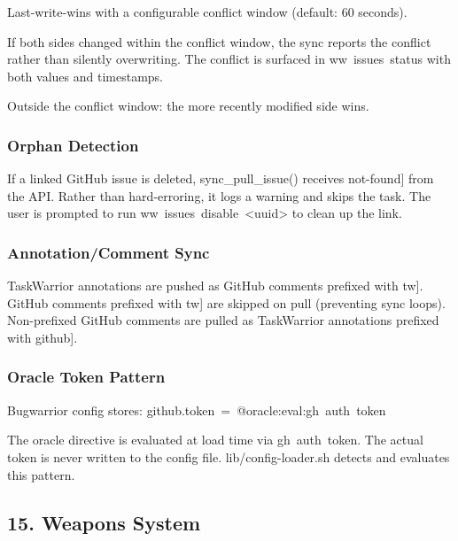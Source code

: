 \documentclass[11pt, a4paper, DIV=14]{scrartcl}
\renewcommand{\texttt}[1]{{\ttfamily\fontsize{8.5}{10.5}\selectfont\color{BabbNavy}#1}}
\let\origRule\rule
\renewcommand{\rule}[2]{\par\noindent{\color{BabbBorder}\origRule{#1}{#2}}\par}
\begin{document}
Last-write-wins with a configurable conflict window (default: 60
seconds).

If both sides changed within the conflict window, the sync reports the
conflict rather than silently overwriting. The conflict is surfaced in
\texttt{ww\ issues\ status} with both values and timestamps.

Outside the conflict window: the more recently modified side wins.

\subsubsection{Orphan Detection}\label{orphan-detection}

If a linked GitHub issue is deleted, \texttt{sync\_pull\_issue()}
receives \texttt{{[}not-found{]}} from the API. Rather than
hard-erroring, it logs a warning and skips the task. The user is
prompted to run
\texttt{ww\ issues\ disable\ \textless{}uuid\textgreater{}} to clean up
the link.

\subsubsection{Annotation/Comment Sync}\label{annotationcomment-sync}

TaskWarrior annotations are pushed as GitHub comments prefixed with
\texttt{{[}tw{]}}. GitHub comments prefixed with \texttt{{[}tw{]}} are
skipped on pull (preventing sync loops). Non-prefixed GitHub comments
are pulled as TaskWarrior annotations prefixed with
\texttt{{[}github{]}}.

\subsubsection{Oracle Token Pattern}\label{oracle-token-pattern}

Bugwarrior config stores:
\texttt{github.token\ =\ @oracle:eval:gh\ auth\ token}

The oracle directive is evaluated at load time via
\texttt{gh\ auth\ token}. The actual token is never written to the
config file. \texttt{lib/config-loader.sh} detects and evaluates this
pattern.

\begin{center}\rule{0.5\linewidth}{0.5pt}\end{center}

\subsection{15. Weapons System}\label{weapons-system}
\end{document}
